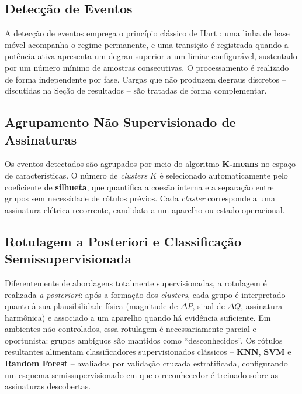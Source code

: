 \documentclass[12pt]{article}
\begin{document}
\subsection{Detec\c{c}\~ao de Eventos}

A detec\c{c}\~ao de eventos emprega o princ\'ipio cl\'assico de Hart \citep{ref1}:
uma linha de base m\'ovel acompanha o regime permanente, e uma transi\c{c}\~ao
\'e registrada quando a pot\^encia ativa apresenta um degrau superior a um limiar
configur\'avel, sustentado por um n\'umero m\'inimo de amostras consecutivas. O
processamento \'e realizado de forma independente por fase. Cargas que n\~ao
produzem degraus discretos -- discutidas na Se\c{c}\~ao de resultados -- s\~ao
tratadas de forma complementar.

\subsection{Agrupamento N\~ao Supervisionado de Assinaturas}

Os eventos detectados s\~ao agrupados por meio do algoritmo \textbf{K-means} no
espa\c{c}o de caracter\'isticas. O n\'umero de \textit{clusters} $K$ \'e
selecionado automaticamente pelo coeficiente de \textbf{silhueta}, que quantifica
a coes\~ao interna e a separa\c{c}\~ao entre grupos sem necessidade de
r\'otulos pr\'evios. Cada \textit{cluster} corresponde a uma assinatura
el\'etrica recorrente, candidata a um aparelho ou estado operacional.

\subsection{Rotulagem a Posteriori e Classifica\c{c}\~ao Semissupervisionada}

Diferentemente de abordagens totalmente supervisionadas, a rotulagem \'e
realizada \textit{a posteriori}: ap\'os a forma\c{c}\~ao dos \textit{clusters},
cada grupo \'e interpretado quanto \`a sua plausibilidade f\'isica
(magnitude de $\Delta P$, sinal de $\Delta Q$, assinatura harm\^onica) e
associado a um aparelho quando h\'a evid\^encia suficiente. Em ambientes n\~ao
controlados, essa rotulagem \'e necessariamente parcial e oportunista: grupos
amb\'iguos s\~ao mantidos como ``desconhecidos''. Os r\'otulos resultantes
alimentam classificadores supervisionados cl\'assicos -- \textbf{KNN}, \textbf{SVM}
e \textbf{Random Forest} -- avaliados por valida\c{c}\~ao cruzada estratificada,
configurando um esquema semissupervisionado em que o reconhecedor \'e treinado
sobre as assinaturas descobertas.
\end{document}

